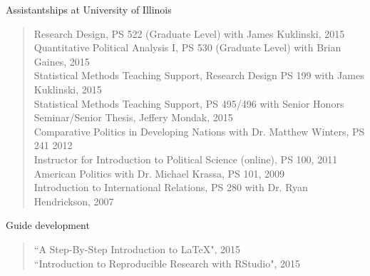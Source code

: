 \documentclass[margin, 10pt]{CVStyleTemplate}\usepackage[]{graphicx}\usepackage[]{color}
\begin{document}
\begin{resume}
Assistantships at University of Illinois
\begin{quotation} \noindent
Research Design, PS 522 (Graduate Level) with James Kuklinski, 2015 \\[6pt] %
Quantitative Political Analysis I, PS 530 (Graduate Level) with Brian Gaines, 2015 \\[6pt] %
Statistical Methods Teaching Support, Research Design PS 199 with James Kuklinski, 2015\\[6pt] %
Statistical Methods Teaching Support, PS 495/496  with Senior Honors Seminar/Senior Thesis, Jeffery Mondak, 2015\\[6pt] %
Comparative Politics in Developing Nations with Dr. Matthew Winters, PS 241 2012 \\[6pt]%
Instructor for Introduction to Political Science (online), PS 100, 2011 \\[6pt]%
American Politics with Dr. Michael Krassa, PS 101, 2009 \\[6pt]%
Introduction to International Relations, PS 280 with Dr. Ryan Hendrickson, 2007%
\end{quotation}
%
Guide development
\begin{quotation}\noindent
``A Step-By-Step Introduction to \LaTeX ", 2015\\[6pt]%
``Introduction to Reproducible Research with RStudio", 2015%
\end{quotation}
%





\end{resume}
\end{document}
